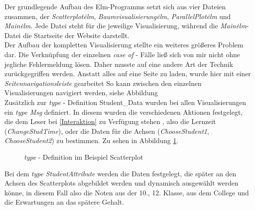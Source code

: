\documentclass[usegeometry=true]{scrartcl}
\begin{document}
\noindent Der grundlegende Aufbau des Elm-Programms setzt sich aus vier Dateien zusammen, der \textit{Scatterplot\.elm}, \textit{Baumvisualisierung\.elm}, \textit{ParallelPlot\.elm} und  \textit{Main\.elm}. Jede Datei steht für die jeweilige Visualisierung, während die \textit{Main\.elm}-Datei die Startseite der Website darstellt.\\

\noindent Der Aufbau der kompletten Visualisierung stellte ein weiteres größeres Problem dar. Die Verknüpfung der einzelnen \textit{case of} - Fälle ließ sich von mir nicht ohne jegliche Fehlermeldung lösen. Daher musste auf eine andere Art der Technik zurückgegriffen werden. Anstatt alles auf eine Seite zu laden, wurde hier mit einer \textit{Seitennavigationsleiste} gearbeitet %
So kann zwischen den einzelnen Visualisierungen navigiert werden, siehe Abbildung \\%

\noindent Zusätzlich zur \textit{type} - Definition Student\_Data wurden bei allen Visualisierungen ein \textit{type Msg} definiert. In diesem wurden die verschiedenen Aktionen festgelegt, die dem Leser bei \ref{Interaktion} zu Verfügung stehen , also die Lernzeit (\textit{ChangeStudTime}), oder die Daten für die Achsen (\textit{ChooseStudent1}, \textit{ChooseStudent2}) zu bestimmen. Zu sehen in Abbildung \ref{MsgScatter}. 

\begin{figure}
\caption{\textit{type} - Definition im Beispiel Scatterplot}
\label{MsgScatter}
\end{figure}

\noindent Bei dem \textit{type StudentAttribute} werden die Daten festgelegt, die später an den Achsen des Scatterplots abgebildet werden und dynamisch ausgewählt werden könne, in diesem Fall also die Noten aus der 10., 12. Klasse, aus dem College und die Erwartungen an das spätere Gehalt.\\
\end{document}
